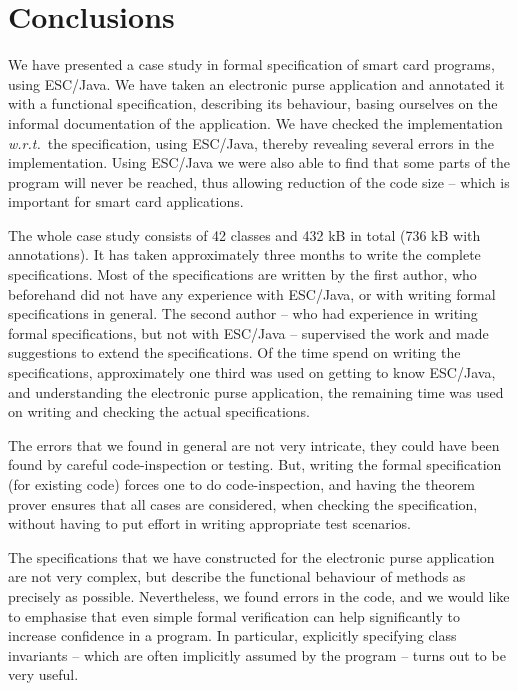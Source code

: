 \documentclass[a4paper]{llncs}
\begin{document}
\section{Conclusions}
\label{SectConcl}

We have presented a case study in formal specification of smart card
programs, using ESC/Java. We have taken an electronic purse
application and annotated it with a functional specification,
describing its behaviour, basing ourselves on the informal
documentation of the application. We have checked the implementation
\emph{w.r.t.}~the specification, using ESC/Java, thereby revealing
several errors in the implementation. Using ESC/Java we were also able 
to find that some parts of the program will never be reached, thus
allowing reduction of the code size -- which is important for smart
card applications. 

The whole case study consists of 42 classes and 432 kB in total (736
kB with annotations).  It has taken approximately three months to
write the complete specifications. Most of the specifications are
written by the first author, who beforehand did not have any
experience with ESC/Java, or with writing formal specifications in
general. The second author -- who had experience in writing formal
specifications, but not with ESC/Java -- supervised the work and made
suggestions to extend the specifications. Of the time spend on writing
the specifications, approximately one third was used on getting to
know ESC/Java, and understanding the electronic purse application, the
remaining time was used on writing and checking the actual
specifications.


The errors that we found in general are not very intricate, they could
have been found by careful code-inspection or testing. But, writing
the formal specification (for existing code) forces one to do
code-inspection, and having the theorem prover ensures that all
cases are considered, when checking the specification, without having
to put effort in writing appropriate test scenarios.

The specifications that we have constructed for the electronic purse
application are not very complex, but describe the functional
behaviour of methods as precisely as possible. Nevertheless, we found
errors in the code, and we would like to emphasise that even simple
formal verification can help significantly to increase confidence in a
program. In particular, explicitly specifying class invariants --
which are often implicitly assumed by the program -- turns
out to be very useful.
\end{document}
